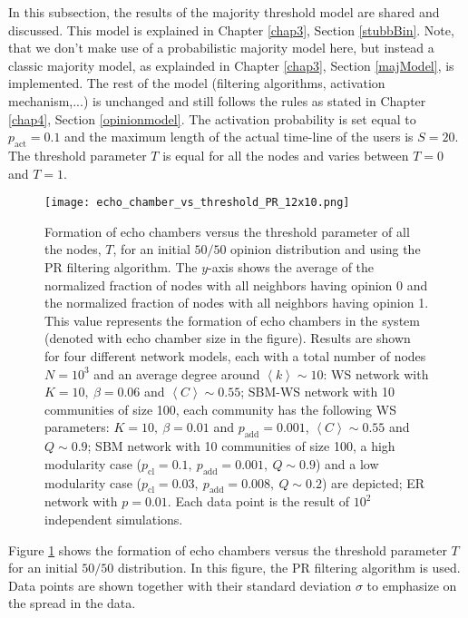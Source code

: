 \documentclass[11 pt , letterpaper , twoside , openright]{book}
\begin{document}
In this subsection, the results of the majority threshold model are shared and discussed. This model is explained in Chapter \ref{chap3}, Section \ref{stubbBin}. Note, that we don't make use of a probabilistic majority model here, but instead a classic majority model, as explainded in Chapter \ref{chap3}, Section \ref{majModel}, is implemented. The rest of the model (filtering algorithms, activation mechanism,...) is unchanged and still follows the rules as stated in Chapter \ref{chap4}, Section \ref{opinionmodel}. The activation probability is set equal to $p_{\text{act}} = 0.1$ and the maximum length of the actual time-line of the users is $S=20$. The threshold parameter $T$ is equal for all the nodes and varies between $T=0$ and $T=1$.
\begin{figure}[H]
	\texttt{[image: echo\_chamber\_vs\_threshold\_PR\_12x10.png]}
	\captionsetup{format=plain}
	\caption[Formation of echo chambers versus the threshold parameter of all the nodes, $T$, for the PR filtering algorithm and an initial $50/50$ opinion distribution]{Formation of echo chambers versus the threshold parameter of all the nodes, $T$, for an initial $50/50$ opinion distribution and using the PR filtering algorithm. The $y$-axis shows the average of the normalized fraction of nodes with all neighbors having opinion 0 and the normalized fraction of nodes with all neighbors having opinion 1. This value represents the formation of echo chambers in the system (denoted with echo chamber size in the figure). Results are shown for four different network models, each with a total number of nodes $N=10^3$ and an average degree around $\left<k\right> \sim 10$: WS network with $K =10,\ \beta = 0.06$ and $\left<C\right> \sim 0.55$; SBM-WS network with 10 communities of size 100, each community has the following WS parameters: $K = 10,\ \beta = 0.01$ and $p_{\text{add}} = 0.001$, $\left<C\right> \sim 0.55$ and $Q \sim 0.9$; SBM network with 10 communities of size 100, a high modularity case ($p_{\text{cl}} = 0.1,\ p_{\text{add}} = 0.001,\ Q \sim 0.9$) and a low modularity case ($p_{\text{cl}} = 0.03,\ p_{\text{add}} = 0.008,\ Q \sim 0.2$) are depicted; ER network with $p= 0.01$. Each data point is the result of $10^2$ independent simulations.}
\label{echo_vs_threshold_PR}
\end{figure}
\noindent
Figure \ref{echo_vs_threshold_PR} shows the formation of echo chambers versus the threshold parameter $T$ for an initial $50/50$ distribution. In this figure, the PR filtering algorithm is used. Data points are shown together with their standard deviation $\sigma$ to emphasize on the spread in the data.\\
\end{document}
